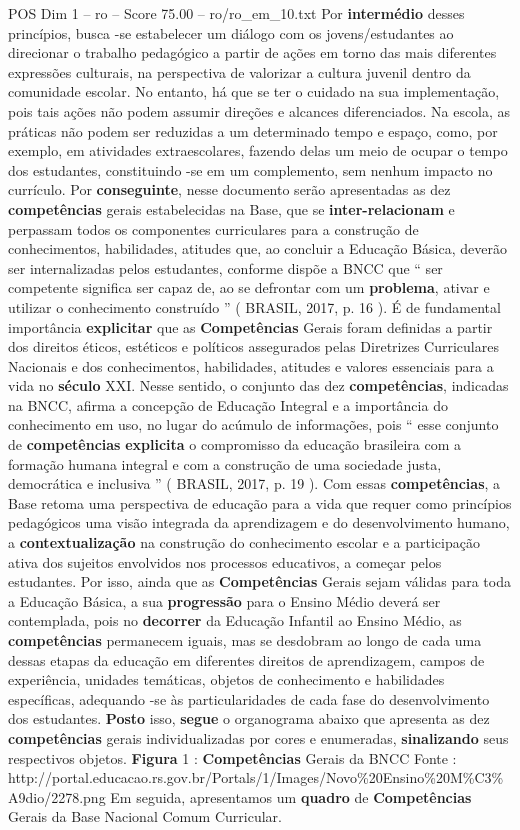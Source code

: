 \begin{textsample}{POS Dim 1 – ro – Score 75.00 – ro/ro\_em\_10.txt}
Por \textbf{intermédio} desses princípios, busca -se estabelecer um diálogo com os jovens/estudantes ao direcionar o trabalho pedagógico a partir de ações em torno das mais diferentes expressões culturais, na perspectiva de valorizar a cultura juvenil dentro da comunidade escolar.
No entanto, há que se ter o cuidado na sua implementação, pois tais ações não podem assumir direções e alcances diferenciados.
Na escola, as práticas não podem ser reduzidas a um determinado tempo e espaço, como, por exemplo, em atividades extraescolares, fazendo delas um meio de ocupar o tempo dos estudantes, constituindo -se em um complemento, sem nenhum impacto no currículo.
Por \textbf{conseguinte}, nesse documento serão apresentadas as dez \textbf{competências} gerais estabelecidas na Base, que se \textbf{inter-relacionam} e perpassam todos os componentes curriculares para a construção de conhecimentos, habilidades, atitudes que, ao concluir a Educação Básica, deverão ser internalizadas pelos estudantes, conforme dispõe a BNCC que “ ser competente significa ser capaz de, ao se defrontar com um \textbf{problema}, ativar e utilizar o conhecimento construído ” ( BRASIL, 2017, p. 16 ).
É de fundamental importância \textbf{explicitar} que as \textbf{Competências} Gerais foram definidas a partir dos direitos éticos, estéticos e políticos assegurados pelas Diretrizes Curriculares Nacionais e dos conhecimentos, habilidades, atitudes e valores essenciais para a vida no \textbf{século} XXI.
Nesse sentido, o conjunto das dez \textbf{competências}, indicadas na BNCC, afirma a concepção de Educação Integral e a importância do conhecimento em uso, no lugar do acúmulo de informações, pois “ esse conjunto de \textbf{competências} \textbf{explicita} o compromisso da educação brasileira com a formação humana integral e com a construção de uma sociedade justa, democrática e inclusiva ” ( BRASIL, 2017, p. 19 ).
Com essas \textbf{competências}, a Base retoma uma perspectiva de educação para a vida que requer como princípios pedagógicos uma visão integrada da aprendizagem e do desenvolvimento humano, a \textbf{contextualização} na construção do conhecimento escolar e a participação ativa dos sujeitos envolvidos nos processos educativos, a começar pelos estudantes.
Por isso, ainda que as \textbf{Competências} Gerais sejam válidas para toda a Educação Básica, a sua \textbf{progressão} para o Ensino Médio deverá ser contemplada, pois no \textbf{decorrer} da Educação Infantil ao Ensino Médio, as \textbf{competências} permanecem iguais, mas se desdobram ao longo de cada uma dessas etapas da educação em diferentes direitos de aprendizagem, campos de experiência, unidades temáticas, objetos de conhecimento e habilidades específicas, adequando -se às particularidades de cada fase do desenvolvimento dos estudantes. \textbf{Posto} isso, \textbf{segue} o organograma abaixo que apresenta as dez \textbf{competências} gerais individualizadas por cores e enumeradas, \textbf{sinalizando} seus respectivos objetos. \textbf{Figura} 1 : \textbf{Competências} Gerais da BNCC Fonte : http://portal.educacao.rs.gov.br/Portals/1/Images/Novo\%20Ensino\%20M\%C3\%A9dio/2278.png Em seguida, apresentamos um \textbf{quadro} de \textbf{Competências} Gerais da Base Nacional Comum Curricular.

\end{textsample}
